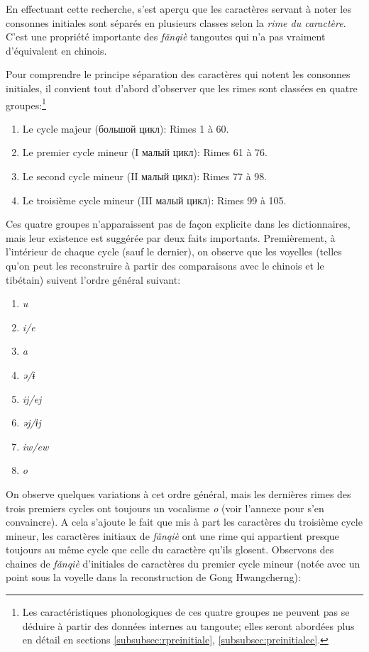 \documentclass[oldfontcommands,twoside,a4paper,11pt,draft]{memoir}
\begin{document}
En effectuant cette recherche, \citet[106-110, 134-137]{sofronov68a} s'est aperçu que les caractères servant à noter les consonnes initiales sont séparés en plusieurs classes selon la \textit{rime du caractère}. C'est une propriété importante des  \textit{fǎnqiè} tangoutes qui n'a pas vraiment d'équivalent en chinois.

Pour comprendre le principe séparation des caractères qui notent les consonnes initiales, il convient tout d'abord d'observer que les rimes sont classées en quatre groupes:\footnote{Les caractéristiques phonologiques de ces quatre groupes ne peuvent pas se déduire à partir des données internes au tangoute; elles seront abordées plus en détail en sections \ref{subsubsec:rpreinitiale}, \ref{subsubsec:preinitialec}.}
\begin{enumerate}
\item Le  cycle majeur (большой цикл): Rimes 1 à 60.
\item Le premier cycle mineur (I малый цикл): Rimes 61 à 76.
\item Le second cycle mineur (II малый цикл): Rimes 77 à 98.
\item Le troisième cycle mineur  (III малый цикл): Rimes 99 à 105.
\end{enumerate}
Ces quatre groupes n'apparaissent pas de façon explicite dans les dictionnaires, mais leur existence est suggérée par deux faits importants. Premièrement, à l'intérieur de chaque cycle (sauf le dernier), on observe que les voyelles (telles qu'on peut les reconstruire à partir des comparaisons avec le chinois et le tibétain) suivent l'ordre général suivant:
\begin{enumerate}
\item \textit{u}
\item \textit{i/e}
\item \textit{a}
\item \textit{ə/ɨ}
\item \textit{ij/ej}
\item \textit{əj/ɨj}
\item \textit{iw/ew}
\item \textit{o}
\end{enumerate}
On observe quelques variations à cet ordre général, mais les dernières rimes des trois premiers cycles ont toujours un vocalisme \textit{o} (voir l'annexe pour s'en convaincre). A cela s'ajoute le fait que mis à part les   caractères du troisième cycle mineur, les caractères initiaux de  \textit{fǎnqiè}  ont une rime qui appartient presque toujours au même cycle que celle du caractère qu'ils glosent. Observons des chaines de \textit{fǎnqiè} d'initiales de caractères du premier  cycle mineur (notée avec un point sous la voyelle dans la reconstruction de Gong Hwangcherng):
\end{document}
